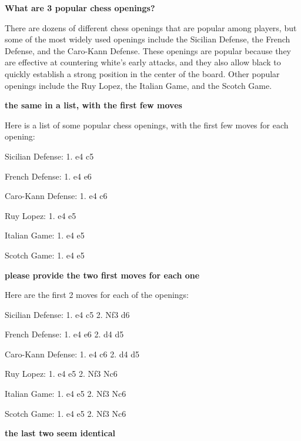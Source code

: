 \documentclass[11pt]{article}
\begin{document}
\begin{framed}
\centering
\vspace{.5em}
\begin{minipage}{.9\textwidth}

\textbf{What are 3 popular chess openings?}

\vspace{1em}

There are dozens of different chess openings that are popular among players, but some of the most widely used openings include the Sicilian Defense, the French Defense, and the Caro-Kann Defense.  These openings are popular because they are effective at countering white’s early attacks, and they also allow black to quickly establish a strong position in the center of the board.  Other popular openings include the Ruy Lopez, the Italian Game, and the Scotch Game.
\vspace{1em}

\textbf{the same in a list, with the first few moves}

\vspace{1em}

Here is a list of some popular chess openings, with the first few moves for each opening:

Sicilian Defense: 1. e4 c5

French Defense: 1. e4 e6

Caro-Kann Defense: 1. e4 c6

Ruy Lopez: 1. e4 e5

Italian Game: 1. e4 e5

Scotch Game: 1. e4 e5
\vspace{1em}

\textbf{please provide the two first moves for each one}

\vspace{1em}

Here are the first 2 moves for each of the openings:

Sicilian Defense: 1. e4 c5 2. Nf3 d6

French Defense: 1. e4 e6 2. d4 d5

Caro-Kann Defense: 1. e4 c6 2. d4 d5

Ruy Lopez: 1. e4 e5 2. Nf3 Nc6

Italian Game: 1. e4 e5 2. Nf3 Nc6

Scotch Game: 1. e4 e5 2. Nf3 Nc6
\vspace{1em}

\textbf{the last two seem identical}


\end{minipage}
\end{framed}
\end{document}
